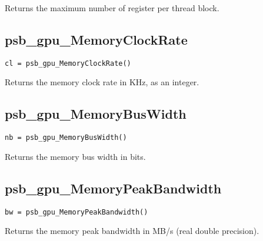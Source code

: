 Returns the maximum number of register per thread block. 


\subsection*{psb\_gpu\_MemoryClockRate }

\begin{verbatim}
cl = psb_gpu_MemoryClockRate()
\end{verbatim}

Returns the memory clock rate in KHz, as an integer. 

\subsection*{psb\_gpu\_MemoryBusWidth }

\begin{verbatim}
nb = psb_gpu_MemoryBusWidth()
\end{verbatim}

Returns the memory bus width in bits.

\subsection*{psb\_gpu\_MemoryPeakBandwidth }

\begin{verbatim}
bw = psb_gpu_MemoryPeakBandwidth()
\end{verbatim}

Returns the memory peak bandwidth in MB/s (real double precision).




